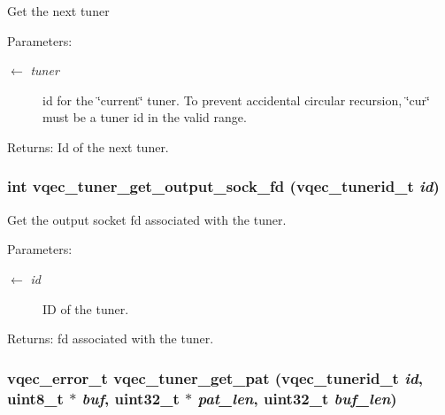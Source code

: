 Get the next tuner \begin{Desc}
\item[Parameters:]
\begin{description}
\item[\mbox{$\leftarrow$} {\em tuner}]id for the \char`\"{}current\char`\"{} tuner. To prevent accidental circular recursion, \char`\"{}cur\char`\"{} must be a tuner id in the valid range. \end{description}
\end{Desc}
\begin{Desc}
\item[Returns:]Id of the next tuner. \end{Desc}
\subsubsection{\setlength{\rightskip}{0pt plus 5cm}int vqec\_\-tuner\_\-get\_\-output\_\-sock\_\-fd (vqec\_\-tunerid\_\-t {\em id})}\label{vqec__tuner_8c_3cb320aedfac98ff1b82a22066a228bc}


Get the output socket fd associated with the tuner.

\begin{Desc}
\item[Parameters:]
\begin{description}
\item[\mbox{$\leftarrow$} {\em id}]ID of the tuner. \end{description}
\end{Desc}
\begin{Desc}
\item[Returns:]fd associated with the tuner. \end{Desc}
\subsubsection{\setlength{\rightskip}{0pt plus 5cm}vqec\_\-error\_\-t vqec\_\-tuner\_\-get\_\-pat (vqec\_\-tunerid\_\-t {\em id}, uint8\_\-t $\ast$ {\em buf}, uint32\_\-t $\ast$ {\em pat\_\-len}, uint32\_\-t {\em buf\_\-len})}\label{vqec__tuner_8c_dfff781bdd37cab5ca561ee04cd89998}


